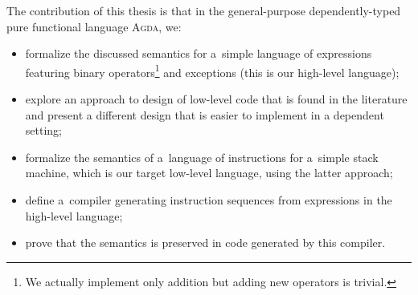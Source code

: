 \noindent The contribution of this thesis is that in the general-purpose dependently-typed
pure functional language \textsc{Agda}, we:
\begin{itemize}
	\item formalize the discussed semantics for a~simple language of expressions
		featuring binary operators\footnote{We actually implement only addition but adding new
		operators is trivial.} and exceptions (this is our high-level language);
	\item explore an approach to design of low-level code that is found in the literature
		and present a different design that is easier to implement in a dependent setting;
	\item formalize the semantics of a~language of instructions for a~simple stack machine,
		which is our target low-level language, using the latter approach;
	\item define a~compiler generating instruction sequences from expressions in the high-level
		language;
	\item prove that the semantics is preserved in code generated by this compiler.
\end{itemize}

